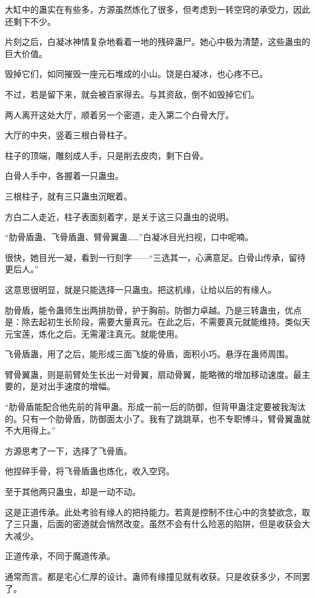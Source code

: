 \begin{this_body}
大缸中的蛊实在有些多，方源虽然炼化了很多，但考虑到一转空窍的承受力，因此还剩下不少。

片刻之后，白凝冰神情复杂地看着一地的残碎蛊尸。她心中极为清楚，这些蛊虫的巨大价值。

毁掉它们，如同摧毁一座元石堆成的小山。饶是白凝冰，也心疼不已。

不过，若是留下来，就会被百家得去。与其资敌，倒不如毁掉它们。

两人离开这处大厅，顺着另一个密道，走入第二个白骨大厅。

大厅的中央，竖着三根白骨柱子。

柱子的顶端，雕刻成人手，只是削去皮肉，剩下白骨。

白骨人手中，各握着一只蛊虫。

三根柱子，就有三只蛊虫沉眠着。

方白二人走近，柱子表面刻着字，是关于这三只蛊虫的说明。

“肋骨盾蛊、飞骨盾蛊、臂骨翼蛊……”白凝冰目光扫视，口中呢喃。

很快，她目光一凝，看到一行刻字——“三选其一，心满意足。白骨山传承，留待更后人。”

这意思很明显，就是只能选择一只蛊虫。把这机缘，让给以后的有缘人。

肋骨盾，能令蛊师生出两排肋骨，护于胸前。防御力卓越。乃是三转蛊虫，优点是：除去起初生长阶段，需要大量真元。在此之后，不需要真元就能维持。类似天元宝莲，炼化之后。无需灌注真元。就能使用。

飞骨盾蛊，用了之后，能形成三面飞旋的骨盾，面积小巧。悬浮在蛊师周围。

臂骨翼蛊，则是前臂处生长出一对骨翼，扇动骨翼，能略微的增加移动速度。最主要的，是对出手速度的增幅。

“肋骨盾能配合他先前的背甲蛊。形成一前一后的防御，但背甲蛊注定要被我淘汰的。只有一个肋骨盾，防御面太小了。我有了跳跳草，也不专职博斗，臂骨翼蛊就不大用得上。”

方源思考了一下，选择了飞骨盾。

他捏碎手骨，将飞骨盾蛊也炼化，收入空窍。

至于其他两只蛊虫，却是一动不动。

这是正道传承。此处考验有缘人的把持能力。若真是控制不住心中的贪婪欲念，取了三只蛊，后面的密道就会悄然改变。虽然不会有什么险恶的陷阱，但是收获会大大减少。

正道传承，不同于魔道传承。

通常而言。都是宅心仁厚的设计。蛊师有缘撞见就有收获。只是收获多少，不同罢了。


\end{this_body}

